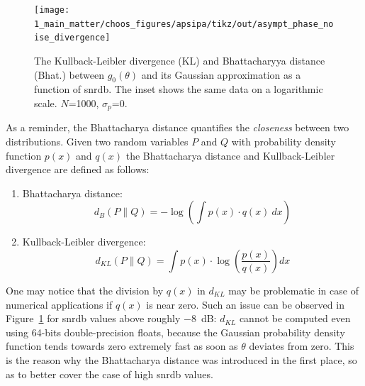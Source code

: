 \begin{figure}
	\centering
	\texttt{[image: 1\_main\_matter/choos\_figures/apsipa/tikz/out/asympt\_phase\_noise\_divergence]}
	\caption{The Kullback-Leibler divergence (KL) and Bhattacharyya distance (Bhat.) between $g_0(\theta)$ and its Gaussian approximation as a function of \gls{snrdb}. The inset shows the same data on a logarithmic scale. $N$=1000, $\sigma_p$=0.}
	\label{fig:choos:apsipa:asympt_linear_divergence}
\end{figure}

As a reminder, the Bhattacharya distance quantifies the \emph{closeness} between two distributions. Given two random variables $P$ and $Q$ with probability density function $p(x)$ and $q(x)$ the Bhattacharya distance and Kullback-Leibler divergence are defined as follows\cite{kailath1967}:

\begin{enumerate}[label=\textit{(\roman*)}]
	\item Bhattacharya distance:
	\begin{equation}
		d_{B}(P \| Q) = - \log \left(\int p(x) \cdot q(x) \ dx\right)
	\end{equation}
	\item Kullback-Leibler divergence:
	\begin{equation}
		d_{KL}(P \| Q) = \int p(x) \cdot \log \left(\frac{p(x)}{q(x)}\right) dx
	\end{equation}
\end{enumerate}

One may notice that the division by $q(x)$ in $d_{KL}$ may be problematic in case of numerical applications if $q(x)$ is near zero. Such an issue can be observed in Figure~\ref{fig:choos:apsipa:asympt_linear_divergence} for \gls{snrdb} values above roughly $-8$~dB: $d_{KL}$ cannot be computed even using 64-bits double-precision floats, because the Gaussian probability density function tends towards zero extremely fast as soon as $\theta$ deviates from zero. This is the reason why the Bhattacharya distance was introduced in the first place, so as to better cover the case of high \gls{snrdb} values.

